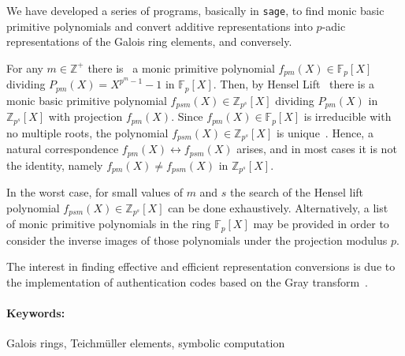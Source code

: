 \documentclass{article}
\newcommand{\KEYWORDS}[1]{\paragraph{Keywords:} #1}
\newcommand{\F}{\mathbb{F}}
\newcommand{\Z}{\mathbb{Z}}
\begin{document}
We have developed a series of programs, basically in {\tt sage}, to find monic basic primitive polynomials and convert additive representations into $p$-adic representations of the Galois ring elements, and conversely.

For any $m\in\Z^+$ there is~\cite{lidl96} a monic primitive polynomial $f_{pm}(X)\in\F_p[X]$ dividing $P_{pm}(X)=X^{{p^m}-1}-1$ in $\F_p[X]$. Then, by Hensel Lift~\cite{mc74} there is a monic basic primitive polynomial $f_{psm}(X)\in\Z_{p^s}[X]$ dividing $P_{pm}(X)$ in $\Z_{p^s}[X]$ with projection $f_{pm}(X)$. Since $f_{pm}(X)\in\F_p[X]$ is irreducible with no multiple roots, the polynomial $f_{psm}(X)\in\Z_{p^s}[X]$ is unique~\cite{w03}. Hence, a natural correspondence $f_{pm}(X)\leftrightarrow f_{psm}(X)$ arises, and in most cases it is not the identity, namely $f_{pm}(X)\not= f_{psm}(X)$ in $\Z_{p^s}[X]$.

In the worst case, for small values of $m$ and $s$ the search of the Hensel lift polynomial $f_{psm}(X)\in\Z_{p^s}[X]$ can be done exhaustively. Alternatively, a list~\cite{lidl96} of monic primitive polynomials in the ring $\F_p[X]$ may be provided in order to consider the inverse images of those polynomials under the projection modulus $p$.

The interest in finding effective and efficient representation conversions is due to the implementation of authentication codes based on the Gray transform~\cite{Ku-CauichT13}.



\KEYWORDS {Galois rings, Teichm\"uller elements, symbolic computation}










%
%  
%
%
%
\end{document}
